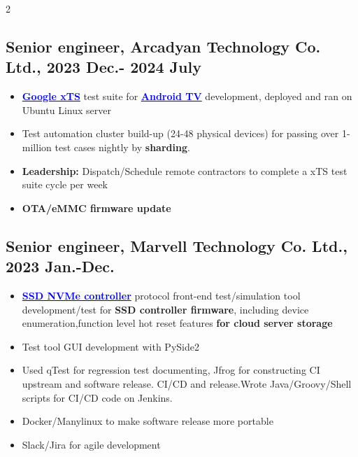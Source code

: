 \documentclass[11pt]{article}
\begin{document}
\begin{multicols*}{2}
\vspace{0.8em}

\subsection*{Senior engineer, Arcadyan Technology Co. Ltd., 2023 Dec.- 2024 July }
\begin{itemize}[noitemsep]
    \item \href{https://source.android.com/docs/compatibility/cts}{\textbf{\textcolor{blue}{Google xTS}}} test suite for \href{https://www.arcadyan.com/zh-hant/solutions/idea/stb/}{\textbf{\textcolor{blue}{Android TV}}} development, deployed and ran on Ubuntu Linux server
    \item Test automation cluster build-up (24-48 physical devices) for passing over 1-million test cases nightly by \textbf{sharding}.
    \item \textbf{Leadership:} Dispatch/Schedule remote contractors to complete a xTS test suite cycle per week
    \item \textbf{OTA/eMMC firmware update}
\end{itemize}

\vspace{0.8em}

\subsection*{Senior engineer, Marvell Technology Co. Ltd., 2023 Jan.-Dec.}
\begin{itemize}[noitemsep]
    \item \href{https://www.marvell.com/embedded-processors/armada-cp/}{\textbf{\textcolor{blue}{SSD NVMe controller}}} protocol front-end test/simulation tool development/test for \textbf{SSD controller firmware}, including device enumeration,function level hot reset features\textbf{ for cloud server storage}
    \item Test tool GUI development with PySide2
    \item Used qTest for regression test documenting, Jfrog for constructing CI upstream and software release. CI/CD and release.Wrote Java/Groovy/Shell scripts for CI/CD code on Jenkins.
    \item Docker/Manylinux to make software release more portable
    \item Slack/Jira for agile development
\end{itemize}

\vspace{0.8em}


\end{multicols*}
\end{document}
